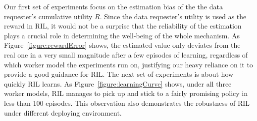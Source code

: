 %

Our first set of experiments focus on the estimation bias of the the data requester's cumulative utility $R$.
Since the data requester's utility is used as the reward in RIL, it would not be a surprise that the reliability of the estimation plays a crucial role in determining the well-being of the whole mechanism. As Figure~\ref{figure:rewardError} shows, the estimated value only deviates from the real one in a very small magnitude after a few episodes of learning, regardless of which worker model the experiments run on, justifying our heavy reliance on it to provide a good guidance for RIL.
The next set of experiments is about how quickly RIL learns. As Figure~\ref{figure:learningCurve} shows, under all three worker models, RIL manages to pick up and stick to a fairly promising policy %
in less than 100 episodes. 
This observation also demonstrates the robustness of RIL under different deploying environment.

